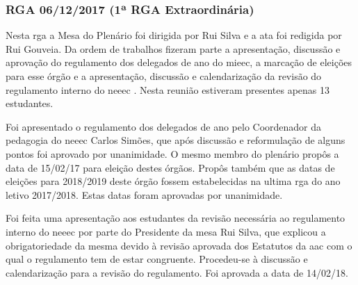 
\subsubsection{RGA 06/12/2017 (1ª RGA Extraordinária)}

Nesta \acrshort{rga} a Mesa do Plenário foi dirigida por Rui Silva e a ata foi redigida por Rui Gouveia. Da ordem de trabalhos fizeram parte a apresentação, discussão e aprovação do regulamento dos delegados de ano do \acrshort{mieec}, a marcação de eleições para esse órgão e a apresentação, discussão e calendarização da revisão do regulamento interno do \acrshort{neeec} . Nesta reunião estiveram presentes apenas 13 estudantes.

Foi apresentado o regulamento dos delegados de ano pelo Coordenador da pedagogia do \acrshort{neeec} Carlos Simões, que após discussão e reformulação de alguns pontos foi aprovado por unanimidade. O mesmo membro do plenário propôs a data de 15/02/17 para eleição destes órgãos. Propôs também que as datas de eleições para 2018/2019 deste órgão fossem estabelecidas na ultima \acrshort{rga} do ano letivo 2017/2018. Estas datas foram aprovadas por unanimidade.

Foi feita uma apresentação aos estudantes da revisão necessária ao regulamento interno do \acrshort{neeec} por parte do Presidente da mesa Rui Silva, que explicou a obrigatoriedade da mesma devido à revisão aprovada dos Estatutos da \acrshort{aac} com o qual o regulamento tem de estar congruente. Procedeu-se à discussão e calendarização para a revisão do regulamento. Foi aprovada a data de 14/02/18.